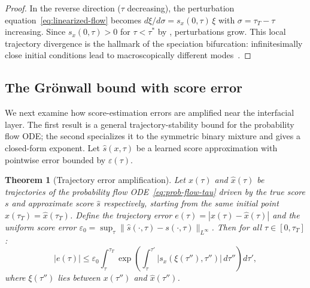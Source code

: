 \documentclass[11pt]{article}
\newtheorem{theorem}{Theorem}[section]
\begin{document}
\begin{proof}
In the reverse direction ($\tau$ decreasing), the perturbation equation~\eqref{eq:linearized-flow} becomes $d\xi/d\sigma = s_x(0,\tau)\,\xi$ with $\sigma = \tau_T - \tau$ increasing.
Since $s_x(0,\tau) > 0$ for $\tau < \tau^\ast$ by , perturbations grow.
This local trajectory divergence is the hallmark of the speciation bifurcation: infinitesimally close initial conditions lead to macroscopically different modes~\citep{raya2023spontaneous, biroli2024dynamical}.
\end{proof}

\subsection{The Gr\"onwall bound with score error}\label{sec:amp:gronwall}

We next examine how score-estimation errors are amplified near the interfacial layer. The first result is a general trajectory-stability bound for the probability flow ODE; the second specializes it to the symmetric binary mixture and gives a closed-form exponent.
Let $\hat{s}(x,\tau)$ be a learned score approximation with pointwise error bounded by $\varepsilon(\tau)$.

\begin{theorem}[Trajectory error amplification]\label{thm:trajectory-error}
Let $x(\tau)$ and $\hat{x}(\tau)$ be trajectories of the probability flow ODE~\eqref{eq:prob-flow-tau} driven by the true score $s$ and approximate score $\hat{s}$ respectively, starting from the same initial point $x(\tau_T) = \hat{x}(\tau_T)$.
Define the trajectory error $e(\tau) = |x(\tau) - \hat{x}(\tau)|$ and the uniform score error $\varepsilon_0 = \sup_\tau \|\hat{s}(\cdot,\tau) - s(\cdot,\tau)\|_{L^\infty}$.
Then for all $\tau \in [0,\tau_T]$:
\begin{equation}\label{eq:gronwall-bound}
  |e(\tau)|
  \leq \varepsilon_0 \int_\tau^{\tau_T}
    \exp\!\left(\int_\tau^{\tau'} |s_x(\xi(\tau''),\tau'')|\,d\tau''\right) d\tau',
\end{equation}
where $\xi(\tau'')$ lies between $x(\tau'')$ and $\hat{x}(\tau'')$.
\end{theorem}
\end{document}
